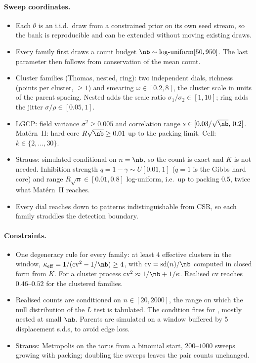 \paragraph{Sweep coordinates.}
\begin{itemize}
  \item Each $\theta$ is an i.i.d.\ draw from a constrained prior on its own seed stream, so the bank is reproducible and can be extended without moving existing draws.
  \item Every family first draws a count budget $\nb\sim\text{log-uniform}[50,950]$. The last parameter then follows from conservation of the mean count.
  \item Cluster families (Thomas, nested, ring): two independent dials, richness (points per cluster, $\ge1$) and smearing $\omega\in[0.2,8]$, the cluster scale in units of the parent spacing. Nested adds the scale ratio $\sigma_1/\sigma_2\in[1,10]$; ring adds the jitter $\sigma/\rho\in[0.05,1]$.
  \item LGCP: field variance $\sigma^2\ge0.005$ and correlation range $s\in[0.03/\sqrt{\nb},\,0.2]$. Mat\'ern~II: hard core $R\sqrt{\nb}\ge0.01$ up to the packing limit. Cell: $k\in\{2,\dots,30\}$.
  \item Strauss: simulated conditional on $n=\nb$, so the count is exact and $K$ is not needed. Inhibition strength $q=1-\gamma\sim U[0.01,1]$ ($q=1$ is the Gibbs hard core) and range $R\sqrt{n}\in[0.01,0.8]$ log-uniform, i.e.\ up to packing $0.5$, twice what Mat\'ern~II reaches.
  \item Every dial reaches down to patterns indistinguishable from CSR, so each family straddles the detection boundary.
\end{itemize}

\paragraph{Constraints.}
\begin{itemize}
  \item One degeneracy rule for every family: at least $4$ effective clusters in the window,
        $\kappa_{\rm eff}=1/(\mathrm{cv}^2-1/\nb)\ge4$, with $\mathrm{cv}=\mathrm{sd}(n)/\nb$ computed in closed form
        from $K$. For a cluster process $\mathrm{cv}^2\approx1/\nb+1/\kappa$.
        Realised cv reaches $0.46$--$0.52$ for the clustered families.
  \item Realised counts are conditioned on $n\in[20,2000]$, the range on which the null distribution of the $L$ test
        is tabulated. The condition fires for , mostly
        nested at small $\nb$. Parents are simulated on a window
        buffered by 5 displacement s.d.s, to avoid edge loss.
  \item Strauss: Metropolis on the torus from a binomial start, $200$--$1000$ sweeps growing with packing;
        doubling the sweeps leaves the pair counts unchanged.
\end{itemize}

